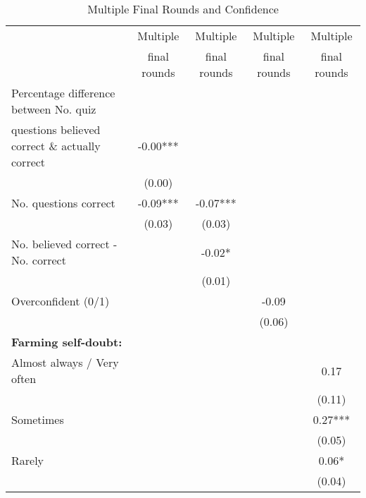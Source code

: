\begin{table}[htbp]
\centering
\hspace*{-1.2cm}
\begin{threeparttable}
\small
\caption{Multiple Final Rounds and Confidence}
\label{tab:B2a}
\begin{tabular}{l cccc}
\hline
\hline
& Multiple & Multiple & Multiple & Multiple \\
& final rounds & final rounds & final rounds & final rounds \\ \hline
Percentage difference between No. quiz&               &               &               &               \\
questions believed correct \& actually correct&       -0.00***&               &               &               \\
                    &      (0.00)   &               &               &               \\
No. questions correct&       -0.09***&       -0.07***&               &               \\
                    &      (0.03)   &      (0.03)   &               &               \\
No. believed correct - No. correct&               &       -0.02*  &               &               \\
                    &               &      (0.01)   &               &               \\
Overconfident (0/1) &               &               &       -0.09   &               \\
                    &               &               &      (0.06)   &               \\
\textbf{Farming self-doubt:}&               &               &               &               \\
Almost always / Very often&               &               &               &        0.17   \\
                    &               &               &               &      (0.11)   \\
Sometimes           &               &               &               &        0.27***\\
                    &               &               &               &      (0.05)   \\
Rarely              &               &               &               &        0.06*  \\
                    &               &               &               &      (0.04)   \\

\end{tabular}
\end{threeparttable}
\end{table}
